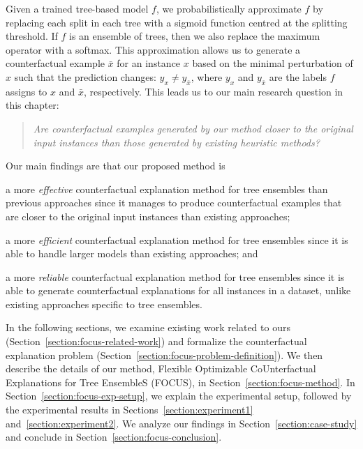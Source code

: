 Given a trained tree-based model $f$, we probabilistically approximate $f$ by replacing each split in each tree with a sigmoid function centred at the splitting threshold. If $f$ is an ensemble of trees, then we also replace the maximum operator with a softmax. 
This approximation allows us to generate a counterfactual example $\bar{x}$ for an instance $x$ based on the minimal perturbation of $x$ such that the prediction changes: $y_{x} \neq y_{\bar{x}}$, where $y_{x}$ and $y_{\bar{x}}$ are the labels $f$ assigns to $x$ and $\bar{x}$, respectively. 
This leads us to our main research question in this chapter:
%
\begin{quote}
\emph{Are counterfactual examples generated by our method closer to the original input instances than those generated by existing heuristic methods?}
\end{quote}
%
Our main findings are that our proposed method is
\begin{enumerate*}[label=(\roman*)]
\item a more \emph{effective} counterfactual explanation method for tree ensembles than previous approaches since it manages to produce counterfactual examples that are closer to the original input instances than existing approaches; 
\item a more \emph{efficient} counterfactual explanation method for tree ensembles since it is able to handle larger models than existing approaches; and
\item a more \emph{reliable} counterfactual explanation method for tree ensembles since it is able to generate counterfactual explanations for all instances in a dataset, unlike existing approaches specific to tree ensembles. 
\end{enumerate*}

In the following sections, we examine existing work related to ours (Section~\ref{section:focus-related-work}) and formalize the counterfactual explanation problem (Section~\ref{section:focus-problem-definition}). 
We then describe the details of our method, Flexible Optimizable CoUnterfactual Explanations for Tree EnsembleS (FOCUS), in Section~\ref{section:focus-method}. 
In Section~\ref{section:focus-exp-setup}, we explain the experimental setup, followed by the experimental results in Sections~\ref{section:experiment1} and~\ref{section:experiment2}. 
We analyze our findings in Section~\ref{section:case-study} and conclude in Section~\ref{section:focus-conclusion}. 